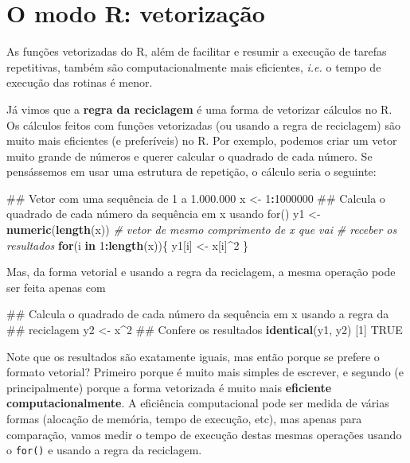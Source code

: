 \documentclass[10pt,a4paper]{book}
\newenvironment{Shaded}{\begin{snugshade}}{\end{snugshade}}
\newcommand{\KeywordTok}[1]{\textcolor[rgb]{0.13,0.29,0.53}{\textbf{#1}}}
\newcommand{\DecValTok}[1]{\textcolor[rgb]{0.00,0.00,0.81}{#1}}
\newcommand{\StringTok}[1]{\textcolor[rgb]{0.31,0.60,0.02}{#1}}
\newcommand{\CommentTok}[1]{\textcolor[rgb]{0.56,0.35,0.01}{\textit{#1}}}
\newcommand{\OtherTok}[1]{\textcolor[rgb]{0.56,0.35,0.01}{#1}}
\newcommand{\ControlFlowTok}[1]{\textcolor[rgb]{0.13,0.29,0.53}{\textbf{#1}}}
\newcommand{\OperatorTok}[1]{\textcolor[rgb]{0.81,0.36,0.00}{\textbf{#1}}}
\newcommand{\NormalTok}[1]{#1}
\begin{document}
\section{O modo R: vetorização}\label{o-modo-r-vetorizauxe7uxe3o}

As funções vetorizadas do R, além de facilitar e resumir a execução de
tarefas repetitivas, também são computacionalmente mais eficientes,
\emph{i.e.} o tempo de execução das rotinas é menor.

Já vimos que a \textbf{regra da reciclagem} é uma forma de vetorizar
cálculos no R. Os cálculos feitos com funções vetorizadas (ou usando a
regra de reciclagem) são muito mais eficientes (e preferíveis) no R. Por
exemplo, podemos criar um vetor muito grande de números e querer
calcular o quadrado de cada número. Se pensássemos em usar uma estrutura
de repetição, o cálculo seria o seguinte:

\begin{Shaded}
\begin{Highlighting}[]
\NormalTok{## Vetor com uma sequência de 1 a 1.000.000}
\NormalTok{x <-}\StringTok{ }\DecValTok{1}\OperatorTok{:}\DecValTok{1000000}
\NormalTok{## Calcula o quadrado de cada número da sequência em x usando for()}
\NormalTok{y1 <-}\StringTok{ }\KeywordTok{numeric}\NormalTok{(}\KeywordTok{length}\NormalTok{(x)) }\CommentTok{# vetor de mesmo comprimento de x que vai}
                         \CommentTok{# receber os resultados}
\ControlFlowTok{for}\NormalTok{(i }\ControlFlowTok{in} \DecValTok{1}\OperatorTok{:}\KeywordTok{length}\NormalTok{(x))\{}
\NormalTok{    y1[i] <-}\StringTok{ }\NormalTok{x[i]}\OperatorTok{^}\DecValTok{2}
\NormalTok{\}}
\end{Highlighting}
\end{Shaded}

Mas, da forma vetorial e usando a regra da reciclagem, a mesma operação
pode ser feita apenas com

\begin{Shaded}
\begin{Highlighting}[]
\NormalTok{## Calcula o quadrado de cada número da sequência em x usando a regra da}
\NormalTok{## reciclagem}
\NormalTok{y2 <-}\StringTok{ }\NormalTok{x}\OperatorTok{^}\DecValTok{2}
\NormalTok{## Confere os resultados}
\KeywordTok{identical}\NormalTok{(y1, y2)}
\NormalTok{[}\DecValTok{1}\NormalTok{] }\OtherTok{TRUE}
\end{Highlighting}
\end{Shaded}

Note que os resultados são exatamente iguais, mas então porque se
prefere o formato vetorial? Primeiro porque é muito mais simples de
escrever, e segundo (e principalmente) porque a forma vetorizada é muito
mais \textbf{eficiente computacionalmente}. A eficiência computacional
pode ser medida de várias formas (alocação de memória, tempo de
execução, etc), mas apenas para comparação, vamos medir o tempo de
execução destas mesmas operações usando o \texttt{for()} e usando a
regra da reciclagem.
\end{document}
